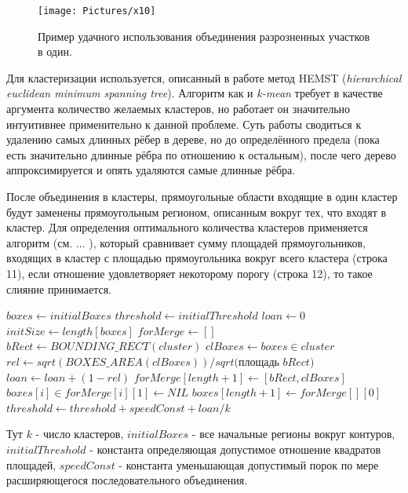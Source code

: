 \documentclass[12pt]{report}
\begin{document}
\begin{figure}[h]
	\centering
	\texttt{[image: Pictures/x10]}
	\caption{Пример удачного использования объединения разрозненных участков в один.}
	\label{fig:cluster_example}
\end{figure}

Для кластеризации используется, описанный в работе \citep{grygorash2006minimum} метод HEMST (\textit{hierarchical 
euclidean minimum spanning tree}). Алгоритм как и \textit{k-mean} требует в качестве аргумента количество желаемых 
кластеров, но работает он значительно интуитивнее применительно к данной проблеме. Суть работы сводиться к удалению 
самых длинных рёбер в дереве, но до определённого предела (пока есть значительно длинные рёбра по отношению к 
остальным), после чего дерево аппроксимируется и опять удаляются самые длинные рёбра.

После объединения в кластеры, прямоугольные области входящие в один кластер будут заменены прямоугольным регионом, 
описанным вокруг тех, что входят в кластер. Для определения оптимального количества кластеров применяется алгоритм 
(см. ... ), который сравнивает сумму площадей прямоугольников, входящих в кластер с площадью прямоугольника вокруг 
всего кластера (строка 11), если отношение удовлетворяет некоторому порогу (строка 12), то такое слияние 
принимается.
\begin{algorithmic}[1]
\STATE $boxes \gets initialBoxes$
\STATE $threshold \gets initialThreshold$
\STATE $loan \gets 0$
\REPEAT
\STATE $initSize \gets length[boxes]$
\STATE $forMerge \gets []$
\STATE $bRect\gets BOUNDING\_RECT(cluster)$
\STATE $clBoxes\gets boxes \in cluster$
\STATE $rel\gets sqrt(BOXES\_AREA(clBoxes))/sqrt($площадь $bRect)$
\STATE $loan \gets loan + (1 - rel)$
\STATE $forMerge[length+1] \gets [bRect, clBoxes]$
\ENDIF
\ENDFOR
\STATE $boxes[i] \in forMerge[i][1] \gets NIL$
\STATE $boxes[length+1] \gets forMerge[][0]$
\STATE $threshold \gets threshold + speedConst + loan/k$
\ENDFOR
{}
\end{algorithmic}
Тут $k$ - число кластеров, $initialBoxes$ - все начальные регионы вокруг контуров, $initialThreshold$ - константа 
определяющая допустимое отношение квадратов площадей, $speedConst$ - константа уменьшающая допустимый порок по мере 
расширяющегося последовательного объединения. 
\end{document}
